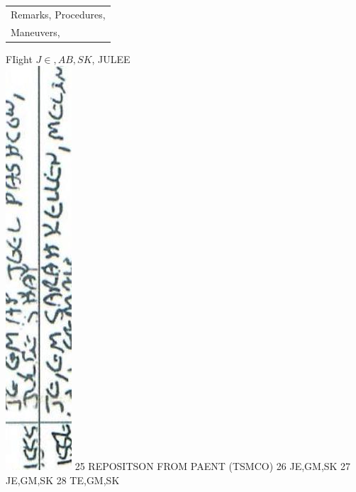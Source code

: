 \documentclass[10pt]{article}
\begin{document}
\begin{center}
\begin{tabular}{l}
Remarks, Procedures, \\
Maneuvers, \\
\hline
\end{tabular}
\end{center}

FIight \(J \in, A B, S K\), JULEE\\
\includegraphics[max width=\textwidth]{2025_02_27_dd68c3d38de88f0516d9g-092(1)} 25 REPOSITSON FROM PAENT (TSMCO) 26 JE,GM,SK 27 JE,GM,SK 28 TE,GM,SK\\
\end{document}
